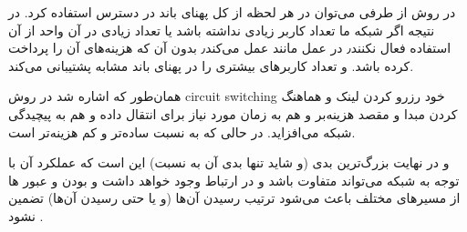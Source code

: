 در روش 
از طرفی می‌توان در هر لحظه از کل پهنای باند در دسترس استفاده کرد. در نتیجه اگر شبکه ما تعداد کاربر زیادی نداشته باشد یا تعداد زیادی در آن واحد از آن استفاده فعال نکنند٫
در عمل مانند 
عمل می‌کند٫ بدون آن که هزینه‌های آن را پرداخت کرده باشد.
و تعداد کاربرهای بیشتری را در  پهنای باند مشابه پشتیبانی می‌کند.


همان‌طور که اشاره شد در روش circuit switching خود رزرو کردن لینک و هماهنگ کردن مبدا و مقصد هزینه‌بر و هم به زمان مورد نیاز برای انتقال داده و هم به پیچیدگی شبکه می‌افزاید. در حالی که 
به نسبت ساده‌تر و کم هزینه‌تر است.

و در نهایت بزرگ‌‌‌ترین بدی 
(و شاید تنها بدی آن به نسبت)
این است که عملکرد آن با توجه به 
شبکه می‌تواند متفاوت باشد و در ارتباط
وجود خواهد داشت و 
بودن 
و عبور 
ها از مسیرهای مختلف
باعث می‌شود ترتیب رسیدن آن‌ها
(و یا حتی رسیدن آن‌ها)
تضمین نشود
.


